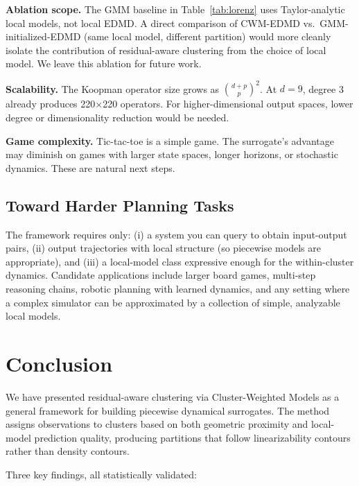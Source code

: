 \documentclass[11pt]{article}
\theoremstyle{definition}
\begin{document}
\textbf{Ablation scope.} The GMM baseline in Table~\ref{tab:lorenz} uses Taylor-analytic local models, not local EDMD. A direct comparison of CWM-EDMD vs.\ GMM-initialized-EDMD (same local model, different partition) would more cleanly isolate the contribution of residual-aware clustering from the choice of local model. We leave this ablation for future work.

\textbf{Scalability.} The Koopman operator size grows as $\binom{d+p}{p}^2$. At $d=9$, degree 3 already produces 220$\times$220 operators. For higher-dimensional output spaces, lower degree or dimensionality reduction would be needed.

\textbf{Game complexity.} Tic-tac-toe is a simple game. The surrogate's advantage may diminish on games with larger state spaces, longer horizons, or stochastic dynamics. These are natural next steps.

\subsection{Toward Harder Planning Tasks}

The framework requires only: (i) a system you can query to obtain input-output pairs, (ii) output trajectories with local structure (so piecewise models are appropriate), and (iii) a local-model class expressive enough for the within-cluster dynamics. Candidate applications include larger board games, multi-step reasoning chains, robotic planning with learned dynamics, and any setting where a complex simulator can be approximated by a collection of simple, analyzable local models.

\section{Conclusion}

We have presented residual-aware clustering via Cluster-Weighted Models as a general framework for building piecewise dynamical surrogates. The method assigns observations to clusters based on both geometric proximity and local-model prediction quality, producing partitions that follow linearizability contours rather than density contours.

Three key findings, all statistically validated:
\end{document}
